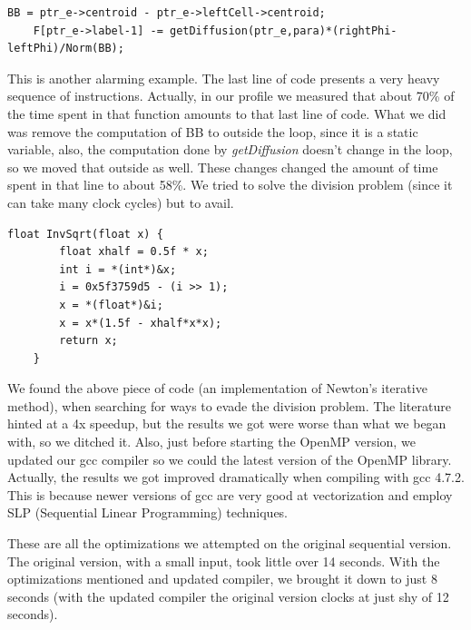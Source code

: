\documentclass[a4paper,10pt,openright,openbib,twocolumn]{article}
\begin{document}
\begin{minipage}{.45\textwidth}
\lstset{
    language=C++,
    basicstyle=\ttfamily\small,
    breaklines=true
}
\begin{lstlisting}[caption=Another excerpt from makeFlux]    
    BB = ptr_e->centroid - ptr_e->leftCell->centroid;
    F[ptr_e->label-1] -= getDiffusion(ptr_e,para)*(rightPhi-leftPhi)/Norm(BB); 
\end{lstlisting}
\end{minipage}    

This is another alarming example. The last line of code presents a very heavy sequence of instructions. Actually, in our profile we measured that about 70\% of the time spent in that function amounts to that last line of code. What we did was remove the computation of BB to outside the loop, since it is a static variable, also, the computation done by \emph{getDiffusion} doesn't change in the loop, so we moved that outside as well. These changes changed the amount of time spent in that line to about 58\%. 
We tried to solve the division problem (since it can take many clock cycles) but to avail.

\begin{minipage}{.45\textwidth}
\lstset{
    language=C++,
    basicstyle=\ttfamily\small,
    breaklines=true
}
\begin{lstlisting}[caption=Fast Square-Root]    
    float InvSqrt(float x) {
        float xhalf = 0.5f * x;
        int i = *(int*)&x;
        i = 0x5f3759d5 - (i >> 1);
        x = *(float*)&i;
        x = x*(1.5f - xhalf*x*x);
        return x;
    }
\end{lstlisting}
\end{minipage} 

We found the above piece of code (an implementation of Newton's iterative method), when searching for ways to evade the division problem. The literature hinted at a 4x speedup, but the results we got were worse than what we began with, so we ditched it.  
Also, just before starting the OpenMP version, we updated our gcc compiler so we could the latest version of the OpenMP library. Actually, the results we got improved dramatically when compiling with gcc 4.7.2. This is because newer versions of gcc are very good at vectorization and employ SLP (Sequential Linear Programming) techniques.

These are all the optimizations we attempted on the original sequential version. The original version, with a small input, took little over 14 seconds. With the optimizations mentioned and updated compiler, we brought it down to just 8 seconds (with the updated compiler the original version clocks at just shy of 12 seconds). 
\end{document}
